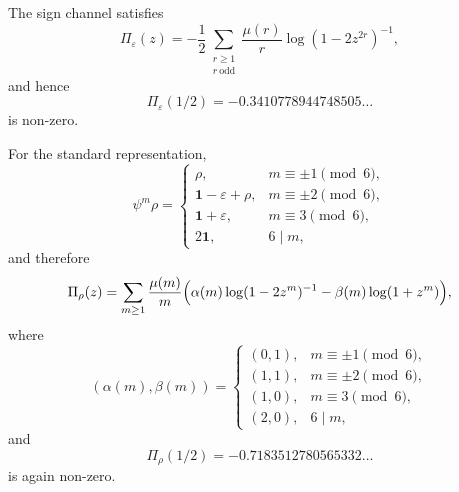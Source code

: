 \begin{proposition}
  \label{prop:s3-example-primitive-channels}
  The sign channel satisfies
  \begin{equation}\label{eq:s3-example-pi-eps}
    \Pi_\varepsilon(z)
    =
    -\frac12
      \sum_{\substack{r\ge 1\\ r\ \mathrm{odd}}}
        \frac{\mu(r)}{r}\log(1-2z^{2r})^{-1},
  \end{equation}
  and hence
  \begin{equation}\label{eq:s3-example-pi-eps-value}
    \Pi_\varepsilon(1/2)
    =-0.3410778944748505\ldots
  \end{equation}
  is non-zero.

  For the standard representation,
  \begin{equation}\label{eq:s3-example-adams-rho}
    \psi^m\rho=
    \begin{cases}
      \rho, & m\equiv \pm 1 \pmod 6, \\
      \mathbf 1-\varepsilon+\rho, & m\equiv \pm 2 \pmod 6, \\
      \mathbf 1+\varepsilon, & m\equiv 3 \pmod 6, \\
      2\mathbf 1, & 6\mid m,
    \end{cases}
  \end{equation}
  and therefore
  \begin{equation}\label{eq:s3-example-pi-rho}
    \Pi_\rho(z)
    =
    \sum_{m\ge 1}\frac{\mu(m)}{m}
      \Bigl(
        \alpha(m)\log(1-2z^m)^{-1}
        -\beta(m)\log(1+z^m)
      \Bigr),
  \end{equation}
  where
  \begin{equation}\label{eq:s3-example-alpha-beta}
    (\alpha(m),\beta(m))=
    \begin{cases}
      (0,1), & m\equiv \pm 1 \pmod 6, \\
      (1,1), & m\equiv \pm 2 \pmod 6, \\
      (1,0), & m\equiv 3 \pmod 6, \\
      (2,0), & 6\mid m,
    \end{cases}
  \end{equation}
  and
  \begin{equation}\label{eq:s3-example-pi-rho-value}
    \Pi_\rho(1/2)
    =-0.7183512780565332\ldots
  \end{equation}
  is again non-zero.
\end{proposition}

